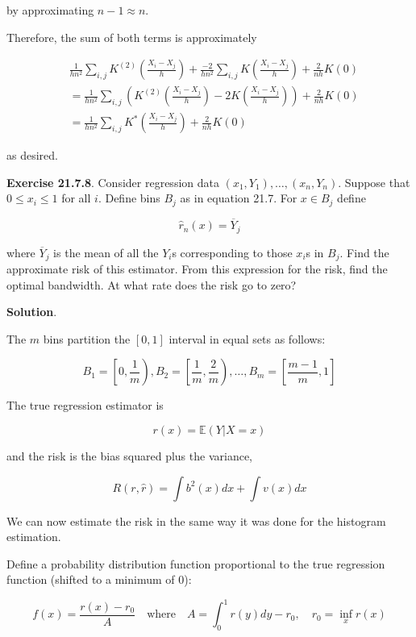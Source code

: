 by approximating \(n - 1 \approx n\).

Therefore, the sum of both terms is approximately

\begin{align*}
&\frac{1}{hn^{2}} \sum_{i, j} K^{(2)} \left(\frac{X_{i} - X_{j}}{h} \right) + \frac{-2}{h n^{2}} \sum_{i, j} K \left( \frac{X_{i} - X_{j}}{h} \right)
+ \frac{2}{nh} K(0) \\
&= \frac{1}{hn^{2}} \sum_{i, j} \left( K^{(2)} \left(\frac{X_{i} - X_{j}}{h} \right) - 2 K \left( \frac{X_{i} - X_{j}}{h} \right) \right) + \frac{2}{nh} K(0) \\
&= \frac{1}{hn^{2}} \sum_{i, j} K^* \left(\frac{X_{i} - X_{j}}{h} \right) + \frac{2}{nh} K(0)
\end{align*}

as desired.

\textbf{Exercise 21.7.8}. Consider regression data
\((x_{1}, Y_{1}), \dots, (x_{n}, Y_{n})\). Suppose that \(0 \leq x_{i} \leq 1\)
for all \(i\). Define bins \(B_{j}\) as in equation 21.7. For
\(x \in B_{j}\) define

\[ \hat{r}_{n}(x) = \overline{Y}_{j} \]

where \(\overline{Y}_{j}\) is the mean of all the \(Y_{i}\)s corresponding
to those \(x_{i}\)s in \(B_{j}\). Find the approximate risk of this
estimator. From this expression for the risk, find the optimal
bandwidth. At what rate does the risk go to zero?

\textbf{Solution}.

The \(m\) bins partition the \([0, 1]\) interval in equal sets as
follows:

\[ B_{1} = \left[0, \frac{1}{m} \right), B_{2} = \left[\frac{1}{m}, \frac{2}{m} \right), \dots, B_m = \left[\frac{m - 1}{m}, 1 \right] \]

The true regression estimator is

\[ r(x) = \mathbb{E}(Y | X = x) \]

and the risk is the bias squared plus the variance,

\[ R(r, \hat{r}) = \int b^{2}(x) dx + \int v(x) dx\]

We can now estimate the risk in the same way it was done for the
histogram estimation.

Define a probability distribution function proportional to the true
regression function (shifted to a minimum of 0):

\[ f(x) = \frac{r(x) - r_{0}}{A} \quad \text{where} \quad A = \int_{0}^{1} r(y) dy - r_{0}, \quad r_{0} = \inf_x r(x) \]

